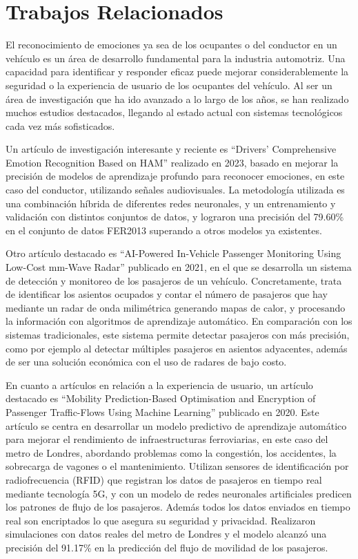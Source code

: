 \documentclass[12pt]{report} %
\begin{document}
\section{Trabajos Relacionados}

El reconocimiento de emociones ya sea de los ocupantes o del conductor en un vehículo es un área de desarrollo fundamental para la industria automotriz. Una capacidad para identificar y responder eficaz puede mejorar considerablemente la seguridad o la experiencia de usuario de los ocupantes del vehículo. Al ser un área de investigación que ha ido avanzado a lo largo de los años, se han realizado muchos estudios destacados, llegando al estado actual con sistemas tecnológicos cada vez más sofisticados.

Un artículo de investigación interesante y reciente es “Drivers’ Comprehensive Emotion Recognition Based on HAM” \cite{rw1} realizado en 2023, basado en mejorar la precisión de modelos de aprendizaje profundo para reconocer emociones, en este caso del conductor, utilizando señales audiovisuales. La metodología utilizada es una combinación híbrida de diferentes redes neuronales, y un entrenamiento y validación con distintos conjuntos de datos, y lograron una precisión del 79.60\% en el conjunto de datos FER2013 superando a otros modelos ya existentes.

Otro artículo destacado es “AI-Powered In-Vehicle Passenger Monitoring Using Low-Cost mm-Wave Radar” \cite{rw2} publicado en 2021, en el que se desarrolla un sistema de detección y monitoreo de los pasajeros de un vehículo. Concretamente, trata de identificar los asientos ocupados y contar el número de pasajeros que hay mediante un radar de onda milimétrica generando mapas de calor, y procesando la información con algoritmos de aprendizaje automático. En comparación con los sistemas tradicionales, este sistema permite detectar pasajeros con más precisión, como por ejemplo al detectar múltiples pasajeros en asientos adyacentes, además de ser una solución económica con el uso de radares de bajo costo.

En cuanto a artículos en relación a la experiencia de usuario, un artículo destacado es “Mobility Prediction-Based Optimisation and Encryption of Passenger Traffic-Flows Using Machine Learning” \cite{rw3} publicado en 2020. Este artículo se centra en desarrollar un modelo predictivo de aprendizaje automático para mejorar el rendimiento de infraestructuras ferroviarias, en este caso del metro de Londres, abordando problemas como la congestión, los accidentes, la sobrecarga de vagones o el mantenimiento. Utilizan sensores de identificación por radiofrecuencia (RFID) que registran los datos de pasajeros en tiempo real mediante tecnología 5G, y con un modelo de redes neuronales artificiales predicen los patrones de flujo de los pasajeros. Además todos los datos enviados en tiempo real son encriptados lo que asegura su seguridad y privacidad. Realizaron simulaciones con datos reales del metro de Londres y el modelo alcanzó una precisión del 91.17\% en la predicción del flujo de movilidad de los pasajeros.
\end{document}
